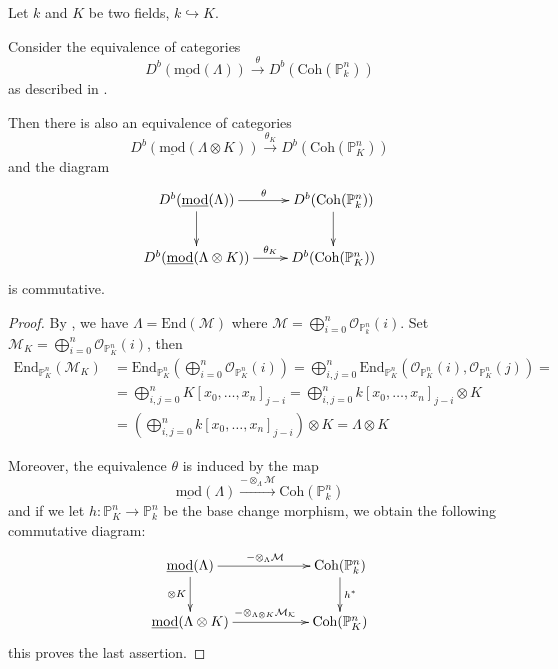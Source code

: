 \documentclass{amsart}
\begin{document}
\begin{lemma}\label{beilinson}
Let $k$ and $K$ be two fields, $k\hookrightarrow K$.

Consider the equivalence of categories 
$$D^{b}(\underline{\mathrm{mod}}(\Lambda))\xrightarrow{\theta} D^{b}(\mathrm{Coh}({\mathbb{P}}^{n}_{k}))$$
as described in \cite{beilinson}.

Then there is also an equivalence of categories 
$$D^{b}(\underline{\mathrm{mod}}(\Lambda\otimes K))\xrightarrow{\theta_{K}} D^{b}(\mathrm{Coh}({\mathbb{P}}^{n}_{K}))$$
and the diagram
$$\xymatrix{
D^{b}(\underline{\mathrm{mod}}(\Lambda)) \ar[d] \ar[r]^-{\theta} & D^{b}(\mathrm{Coh}({\mathbb{P}}^{n}_{k}))\ar[d]\\
D^{b}(\underline{\mathrm{mod}}(\Lambda\otimes K)) \ar[r]^-{\theta_{K}} & D^{b}(\mathrm{Coh}({\mathbb{P}}^{n}_{K}))
}$$
is commutative.
\end{lemma}

\begin{proof}
By \cite{beilinson}, we have $\Lambda=\text{End}(\mathcal{M})$ where $\mathcal{M}=\bigoplus_{i=0}^{n}{\mathcal{O}}_{{\mathbb{P}}^{n}_{k}}(i)$. Set $\mathcal{M}_{K}=\bigoplus_{i=0}^{n}{\mathcal{O}}_{{\mathbb{P}}^{n}_{K}}(i)$, then
\begin{align*}
\text{End}_{{\mathbb{P}}^{n}_{K}}(\mathcal{M}_{K}) &=\text{End}_{{\mathbb{P}}^{n}_{K}}\left(\bigoplus_{i=0}^{n}{\mathcal{O}}_{{\mathbb{P}}^{n}_{K}}(i)\right) =\bigoplus_{i,j=0}^{n}\text{End}_{{\mathbb{P}}^{n}_{K}}\left({\mathcal{O}}_{{\mathbb{P}}^{n}_{K}}(i),{\mathcal{O}}_{{\mathbb{P}}^{n}_{K}}(j)\right) = \\
&=\bigoplus_{i,j=0}^{n} K[x_{0},\ldots,x_{n}]_{j-i}=\bigoplus_{i,j=0}^{n} k[x_{0},\ldots,x_{n}]_{j-i}\otimes K \\
&=\left(\bigoplus_{i,j=0}^{n} k[x_{0},\ldots,x_{n}]_{j-i}\right)\otimes K=\Lambda \otimes K
\end{align*}

Moreover, the equivalence $\theta$ is induced by the map
$$\underline{\mathrm{mod}}(\Lambda)\xrightarrow{-\otimes_{\Lambda}\mathcal{M}} \text{Coh}({\mathbb{P}}^{n}_{k})$$
and if we let $h:{\mathbb{P}}^{n}_{K}{\rightarrow} {\mathbb{P}}^{n}_{k}$ be the base change morphism, we obtain the following commutative diagram:
$$\xymatrix{
\underline{\mathrm{mod}}(\Lambda) \ar[rr]^{-\otimes_{\Lambda}\mathcal{M}} \ar[d]_{\otimes K}& & \text{Coh}({\mathbb{P}}^{n}_{k}) \ar[d]^{h^{*}} \\
\underline{\mathrm{mod}}(\Lambda\otimes K)\ar[rr]^{-\otimes_{\Lambda\otimes K}\mathcal{M_{K}} }& &\text{Coh}({\mathbb{P}}^{n}_{K})
}$$
this proves the last assertion.
\end{proof}
\end{document}
